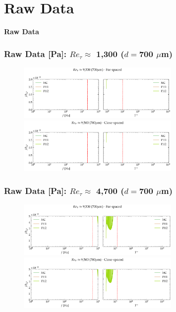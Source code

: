 \documentclass[aspectratio=169,9pt]{beamer}
\begin{document}
\section{Raw Data}
\begin{frame}
  \centering
  \vfill
  {\Huge\bfseries \textcolor{cardinalred}{Raw Data}}
  \vfill
\end{frame}


\begin{frame}
  \frametitle{Raw Data [Pa]: $Re_\tau\approx$ 1,300 ($d=$700 $\mu$m)}
  \begin{figure}
    \centering
    \includegraphics[width=0.7\textwidth]{tf_corrected_spectra/700_0psi_raw_spec_far.png}
    \includegraphics[width=0.7\textwidth]{tf_corrected_spectra/700_0psi_raw_spec_close.png}
  \end{figure}
\end{frame}

\begin{frame}
  \frametitle{Raw Data [Pa]: $Re_\tau \approx$ 4,700 ($d=$700 $\mu$m)}
  \begin{figure}
    \centering
    \includegraphics[width=0.7\textwidth]{tf_corrected_spectra/700_50psi_raw_spec_far.png}
    \includegraphics[width=0.7\textwidth]{tf_corrected_spectra/700_50psi_raw_spec_close.png}
  \end{figure}
\end{frame}
\end{document}
